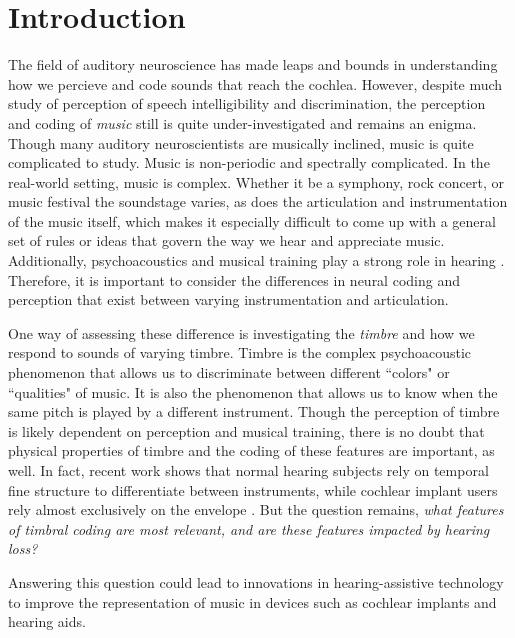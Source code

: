 \documentclass[conference]{IEEEtran}
\begin{document}
\section{Introduction}
The field of auditory neuroscience has made leaps and bounds in understanding how we percieve and code sounds that reach the cochlea. However, despite much study of perception of speech intelligibility and discrimination, the perception and coding of  \textit{music} still is quite under-investigated and remains an enigma. Though many auditory neuroscientists are musically inclined, music is quite complicated to study. Music is non-periodic and spectrally complicated. In the real-world setting, music is complex. Whether it be a symphony, rock concert, or music festival the soundstage varies, as does the articulation and instrumentation of the music itself, which makes it especially difficult to come up with a general set of rules or ideas that govern the way we hear and appreciate music. Additionally, psychoacoustics and musical training play a strong role in hearing \cite{bidelman_enhanced_2011}. Therefore, it is important to consider the differences in neural coding and perception that exist between varying instrumentation and articulation.

One way of assessing these difference is investigating the \textit{timbre} and how we respond to sounds of varying timbre. Timbre is the complex psychoacoustic phenomenon that allows us to discriminate between different ``colors" or ``qualities" of music. It is also the phenomenon that allows us to know when the same pitch is played by a different instrument. Though the perception of timbre is likely dependent on perception and musical training, there is no doubt that physical properties of timbre and the coding of these features are important, as well. In fact, recent work shows that normal hearing subjects rely on temporal fine structure to differentiate between instruments, while cochlear implant users rely almost exclusively on the envelope \cite{heng_impaired_2011}. But the question remains, \textit{what features of timbral coding are most relevant, and are these features impacted by hearing loss?} 

Answering this question could lead to innovations in hearing-assistive technology to improve the representation of music in devices such as cochlear implants and hearing aids.
\end{document}

